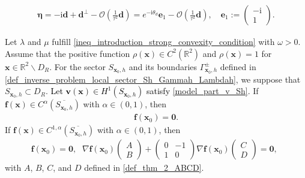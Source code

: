 \documentclass[10pt,a4paper]{amsart}
\begin{document}
	\begin{align} \label{eq_IP_eta_Taylorexpansion_e1_-i1}
		\bm{\eta} = - \mathrm{i}  \mathbf{d} + \mathbf{d}^\perp - \mathcal{O}\left(\frac{1}{\tau^2} \mathbf{d}\right) = e^{-\mathrm{i}\theta_d} \mathbf{e}_1 - \mathcal{O}\left(\frac{1}{\tau^2} \mathbf{d}\right),\quad
		\mathbf{e}_1:=\begin{pmatrix}
			- \mathrm{i} \\
			1
		\end{pmatrix} .
	\end{align}

\begin{theorem} \label{thm_inverse_problem_Sh_f0=0_nablaf0=0}
	Let $ \lambda $ and $ \mu $ fulfill \eqref{ineq_introduction_strong_convexity_condition} with $ \omega > 0 $. Assume that the positive function $ \rho\left(\mathbf{x}\right)\in C^2\left(\mathbb{R}^2\right) $ and $ \rho\left(\mathbf{x}\right)=1 $ for $ \mathbf{x}\in\mathbb{R}^2 \backslash D_R $. For the sector $ S_{\mathbf{x}_0,h} $ and its boundaries $ \Gamma_{\mathbf{x}_0,h}^\pm $ defined in \eqref{def_inverse_problem_local_sector_Sh_Gammah_Lambdah}, we suppose that $ S_{\mathbf{x}_0,h}\subset D_R $. \textcolor{black}{Let $ \mathbf{v}\left(\mathbf{x}\right) \in H^1\left(S_{\mathbf{x}_0,h}\right) $ satisfy} \eqref{model_part_v_Sh}. If $\mathbf{f}\left(\mathbf{x}\right) \in C^{\alpha} \left(\overline{S_{\mathbf{x}_0,h}}\right)$ with $\alpha\in (0,1)$,  then \begin{align*} 
\mathbf{f} \left(\mathbf{x}_0\right) = \bm{0}. 
	\end{align*}
If $\mathbf{f}\left(\mathbf{x}\right) \in C^{1,\alpha} \left(\overline{S_{\mathbf{x}_0,h}}\right)$ with $\alpha\in (0,1)$,  then 
	\begin{equation} \label{eq_IP_gradientf}
\mathbf{f} \left(\mathbf{x}_0\right) = \bm{0},\	\begin{aligned}
			\nabla\mathbf{f}\left(\mathbf{x}_0\right)
			\begin{pmatrix}
				A \\ 
				B
			\end{pmatrix}
			+
			\begin{pmatrix}
				0 & -1 \\
				1 & 0
			\end{pmatrix}
			\nabla\mathbf{f}\left(\mathbf{x}_0\right)
			\begin{pmatrix}
				C \\ 
				D
			\end{pmatrix}
			=\mathbf{0},
		\end{aligned}
	\end{equation}
	with $ A $, $ B $, $ C $, and $ D $ defined in \eqref{def_thm_2_ABCD}. 
\end{theorem}
\end{document}
